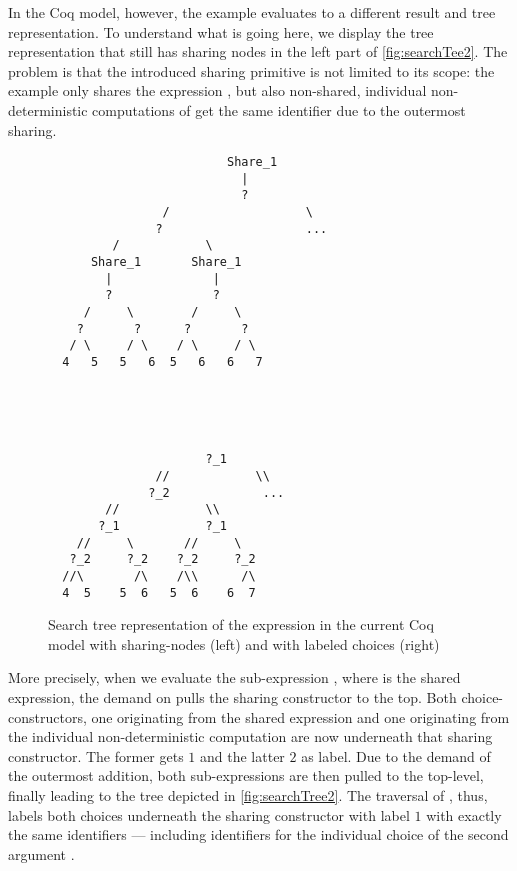 In the Coq model, however, the example evaluates to a different
result and tree representation.
To understand what is going here, we display the tree representation
that still has sharing nodes in the left part of \autoref{fig:searchTee2}.
The problem is that the introduced sharing primitive is not limited to
its scope: the example only shares the expression , but
also non-shared, individual non-deterministic computations of  get the same identifier due to the outermost sharing.

\begin{figure}[h]
\begin{minipage}{0.50\textwidth}
 \centering
\begin{BVerbatim}
                         Share_1
                           |
                           ?
                /                   \
               ?                    ...
         /            \
      Share_1       Share_1
        |              |
        ?              ?
     /     \        /     \
    ?       ?      ?       ?
   / \     / \    / \     / \
  4   5   5   6  5   6   6   7
\end{BVerbatim}
\end{minipage}
\begin{minipage}{0.49\textwidth}
\centering
\begin{BVerbatim}



  
                      ?_1
               //            \\
              ?_2             ...
        //            \\
       ?_1            ?_1
    //     \       //     \
   ?_2     ?_2    ?_2     ?_2
  //\       /\    /\\      /\
  4  5    5  6   5  6    6  7
\end{BVerbatim}
\end{minipage}
\caption{Search tree representation of the expression 
  in the current Coq model with sharing-nodes (left) and with labeled
  choices (right)}
\label{fig:searchTree2}
\end{figure}

More precisely, when we evaluate the sub-expression ,
where \cyinl{x} is the shared expression, the demand on
\cyinl{x} pulls the sharing constructor to the top.
Both choice-constructors, one originating from the shared expression
 and one originating from the individual
non-deterministic computation \cyinl{1 ? 2} are now underneath that
sharing constructor.
The former gets $1$ and the latter $2$ as label.
Due to the demand of the outermost addition, both sub-expressions
are then pulled to the top-level, finally leading to the tree depicted in
\autoref{fig:searchTree2}.
The traversal of \cinl{numberChoices}, thus, labels both choices
underneath the sharing constructor with label $1$ with exactly the
same identifiers --- including identifiers for the individual choice
of the second argument \cyinl{1 ? 2}.

